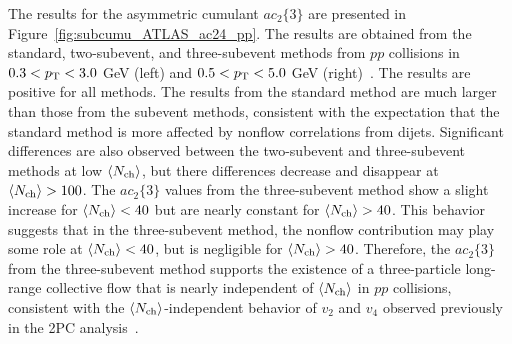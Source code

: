 The results for the asymmetric cumulant $ac_2\{3\}$ are presented in Figure~\ref{fig:subcumu_ATLAS_ac24_pp}. The results are obtained from the standard, two-subevent, and three-subevent methods from $pp$ collisions in $0.3<p_\text{T}<3.0$ GeV (left) and $0.5<p_\text{T}<5.0$ GeV (right)~\cite{Aaboud:2018syf}. The results are positive for all methods. The results from the standard method are much larger than those from the subevent methods, consistent with the expectation that the standard method is more affected by nonflow correlations from dijets. Significant differences are also observed between the two-subevent and three-subevent methods at low $\left\langle N_\text{ch}\right\rangle$, but there differences decrease and disappear at $\left\langle N_\text{ch}\right\rangle>100$. The $ac_2\{3\}$ values from the three-subevent method show a slight increase for $\left\langle N_\text{ch}\right\rangle<40$ but are nearly constant for $\left\langle N_\text{ch}\right\rangle>40$. This behavior suggests that in the three-subevent method, the nonflow contribution may play some role at $\left\langle N_\text{ch}\right\rangle<40$, but is negligible for $\left\langle N_\text{ch}\right\rangle>40$. Therefore, the $ac_2\{3\}$ from the three-subevent method supports the existence of a three-particle long-range collective flow that is nearly independent of $\left\langle N_\text{ch}\right\rangle$ in $pp$ collisions, consistent with the $\left\langle N_\text{ch}\right\rangle$-independent behavior of $v_2$ and $v_4$ observed previously in the 2PC analysis~\cite{Aaboud:2016yar}.

